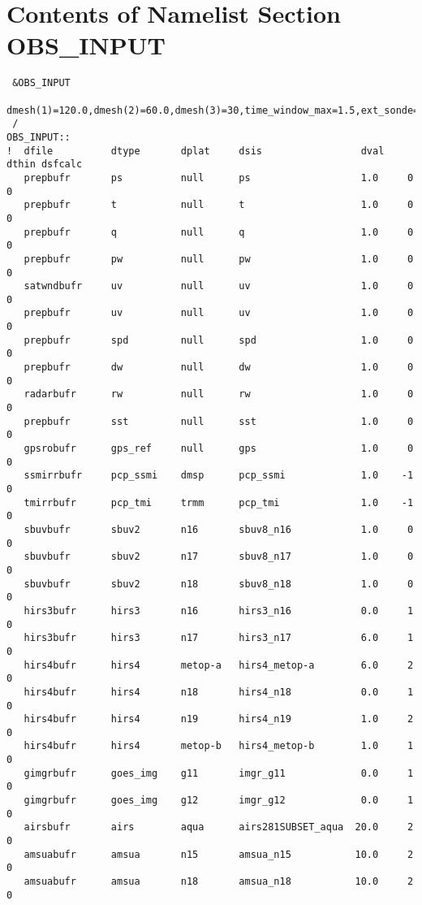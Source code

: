 \chapter{Contents of Namelist Section OBS\_INPUT}\label{gsi_obslist}

\begin{scriptsize}
\begin{verbatim}
 &OBS_INPUT
   dmesh(1)=120.0,dmesh(2)=60.0,dmesh(3)=30,time_window_max=1.5,ext_sonde=.true.,
 /
OBS_INPUT::
!  dfile          dtype       dplat     dsis                 dval    dthin dsfcalc
   prepbufr       ps          null      ps                   1.0     0     0
   prepbufr       t           null      t                    1.0     0     0
   prepbufr       q           null      q                    1.0     0     0
   prepbufr       pw          null      pw                   1.0     0     0
   satwndbufr     uv          null      uv                   1.0     0     0
   prepbufr       uv          null      uv                   1.0     0     0
   prepbufr       spd         null      spd                  1.0     0     0
   prepbufr       dw          null      dw                   1.0     0     0
   radarbufr      rw          null      rw                   1.0     0     0
   prepbufr       sst         null      sst                  1.0     0     0
   gpsrobufr      gps_ref     null      gps                  1.0     0     0
   ssmirrbufr     pcp_ssmi    dmsp      pcp_ssmi             1.0    -1     0
   tmirrbufr      pcp_tmi     trmm      pcp_tmi              1.0    -1     0
   sbuvbufr       sbuv2       n16       sbuv8_n16            1.0     0     0
   sbuvbufr       sbuv2       n17       sbuv8_n17            1.0     0     0
   sbuvbufr       sbuv2       n18       sbuv8_n18            1.0     0     0
   hirs3bufr      hirs3       n16       hirs3_n16            0.0     1     0
   hirs3bufr      hirs3       n17       hirs3_n17            6.0     1     0
   hirs4bufr      hirs4       metop-a   hirs4_metop-a        6.0     2     0
   hirs4bufr      hirs4       n18       hirs4_n18            0.0     1     0
   hirs4bufr      hirs4       n19       hirs4_n19            1.0     2     0
   hirs4bufr      hirs4       metop-b   hirs4_metop-b        1.0     1     0
   gimgrbufr      goes_img    g11       imgr_g11             0.0     1     0
   gimgrbufr      goes_img    g12       imgr_g12             0.0     1     0
   airsbufr       airs        aqua      airs281SUBSET_aqua  20.0     2     0
   amsuabufr      amsua       n15       amsua_n15           10.0     2     0
   amsuabufr      amsua       n18       amsua_n18           10.0     2     0

\end{verbatim}
\end{scriptsize}
